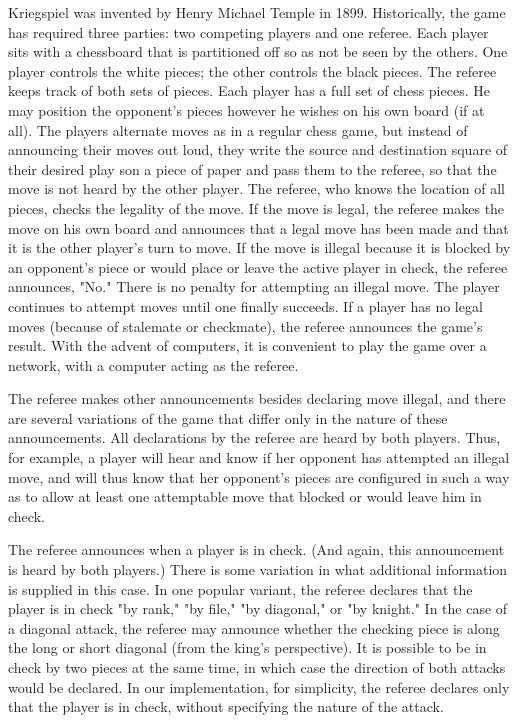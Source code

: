 \documentclass[11pt]{article}
\begin{document}
Kriegspiel was invented by Henry Michael Temple in 1899.  Historically, the game has required three parties: two
competing players and one referee.  Each player sits with a chessboard that is partitioned off so as not be seen by the
others.  One player controls the white pieces; the other controls the black pieces.  The referee keeps track of both
sets of pieces.  Each player has a full set of chess pieces.  He may position the opponent's pieces however he wishes on
his own board (if at all).  The players alternate moves as in a regular chess game, but instead of announcing their
moves out loud, they write the source and destination square of their desired play son a piece of paper and pass them to
the referee, so that the move is not heard by the other player. The referee, who knows the location of all pieces,
checks the legality of the move.  If the move is legal, the referee makes the move on his own board and announces that a
legal move has been made and that it is the other player's turn to move.  If the move is illegal because it is blocked
by an opponent's piece or would place or leave the active player in check, the referee announces, "No."  There is no
penalty for attempting an illegal move.  The player continues to attempt moves until one finally succeeds.  If a player
has no legal moves (because of stalemate or checkmate), the referee announces the game's result.  With the advent of
computers, it is convenient to play the game over a network, with a computer acting as the referee.

The referee makes other announcements besides declaring move illegal, and there are several variations of the game that
differ only in the nature of these announcements.  All declarations by the referee are heard by both players.  Thus, for
example, a player will hear and know if her opponent has attempted an illegal move, and will thus know that her
opponent's pieces are configured in such a way as to allow at least one attemptable move that blocked or would leave him
in check.  

The referee announces when a player is in check.  (And again, this announcement is heard by both players.)  There is
some variation in what additional information is supplied in this case.  In one popular variant, the referee declares
that the player is in check "by rank," "by file," "by diagonal," or "by knight."  In the case of a diagonal attack, the
referee may announce whether the checking piece is along the long or short diagonal (from the king's perspective).  It
is possible to be in check by two pieces at the same time, in which case the direction of both attacks would be
declared.  In our implementation, for simplicity, the referee declares only that the player is in check, without
specifying the nature of the attack.
\end{document}
